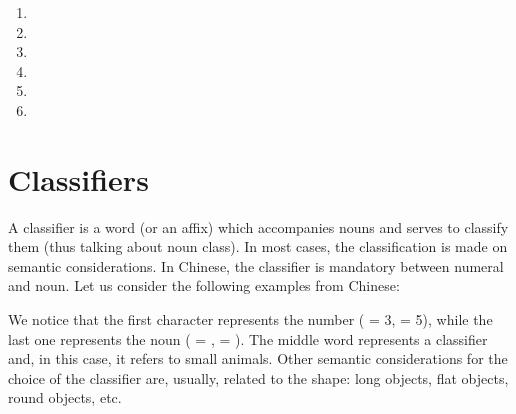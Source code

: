 \begin{refsection}
\begin{mysolution}
\begin{solutions}
\begin{enumerate}[start = 13]
    \end{enumerate}
    \item \begin{enumerate}[start = 19]

        \item {}
        \item {}
        \item {}
        \item {}
        \item {}
        \item[]
    \end{enumerate}
\end{solutions}
\end{mysolution}

\section{Classifiers}

A classifier is a word (or an affix) which accompanies nouns and serves to classify them (thus talking about noun class). In most cases, the classification is made on semantic considerations. In Chinese, the classifier is mandatory between numeral and noun. Let us consider the following examples from Chinese:


 We notice that the first character represents the number ({} = 3, {} = 5), while the last one represents the noun ({} = , {} = ). The middle word represents a classifier and, in this case, it refers to small animals. Other semantic considerations for the choice of the classifier are, usually, related to the shape: long objects, flat objects, round objects, etc.


\end{refsection}
